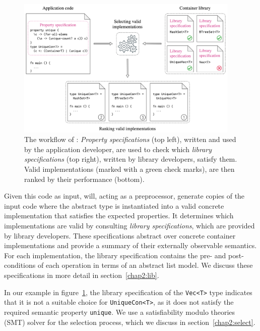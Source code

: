 \begin{figure}[t]
  \centering
      \includegraphics[width=0.95\textwidth]{./overview.png}
    \caption{The workflow of \Primrose{}:
    \emph{Property specifications} (top left), written and used by the application developer, are used to check which \emph{library specifications} (top right), written by library developers, satisfy them.
    Valid implementations (marked with a green check marks), are then ranked by their performance (bottom).
    }
    \label{overview:design}
\end{figure}

Given this code as input, \Primrose{} will, acting as 
a preprocessor, generate copies of the input code where the abstract type is instantiated into a valid concrete implementation that satisfies the expected properties. It determines 
which implementations are valid by consulting \emph{library specifications}, which are provided by library developers. These specifications abstract over concrete container implementations 
and provide a summary of their externally observable semantics. 
For each implementation, the library specification contains the pre- and post-conditions of each operation in terms of an abstract list model. We discuss these specifications in more detail in 
section~\ref{chap2:lib}. 

In our example in 
figure~\ref{overview:design}, the library specification of the \lstinline{Vec<T>} type indicates that it is not a suitable choice for \lstinline{UniqueCon<T>}, as it does not satisfy the required semantic property \lstinline{unique}.
We use a satisfiability modulo theories (SMT) solver for the selection process, which we discuss in section~\ref{chap2:select}.

